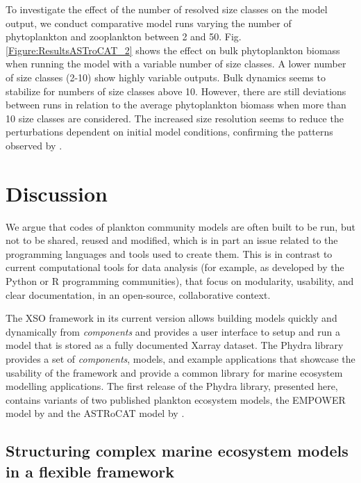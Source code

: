 \documentclass[gmd, manuscript]{copernicus}
\begin{document}
To investigate the effect of the number of resolved size classes on the model output, we conduct comparative model runs varying the number of phytoplankton and zooplankton between 2 and 50.
Fig. \ref{Figure:ResultsASTroCAT_2} shows the effect on bulk phytoplankton biomass when running the model with a variable number of size classes. A lower number of size classes (2-10) show highly variable outputs. Bulk dynamics seems to stabilize for numbers of size classes above 10. However, there are still deviations between runs in relation to the average phytoplankton biomass when more than 10 size classes are considered. The increased size resolution seems to reduce the perturbations dependent on initial model conditions, confirming the patterns observed by \citet{Baird2010IncreasingErrors}.



\section{Discussion}

We argue that codes of plankton community models are often built to be run, but not to be shared, reused and modified, which is in part an issue related to the programming languages and tools used to create them. This is in contrast to current computational tools for data analysis (for example, as developed by the Python or R programming communities), that focus on modularity, usability, and clear documentation, in an open-source, collaborative context. 

The XSO framework in its current version allows building models quickly and dynamically from \textit{components} and provides a user interface to setup and run a model that is stored as a fully documented Xarray dataset. The Phydra library provides a set of \textit{components}, models, and example applications that showcase the usability of the framework and provide a common library for marine ecosystem modelling applications. 
The first release of the Phydra library, presented here, contains variants of two published plankton ecosystem models, the EMPOWER model by \citet{Anderson2015c} and the ASTRoCAT model by \citet{Banas2011b}.


\subsection{Structuring complex marine ecosystem models in a flexible framework}
\end{document}
